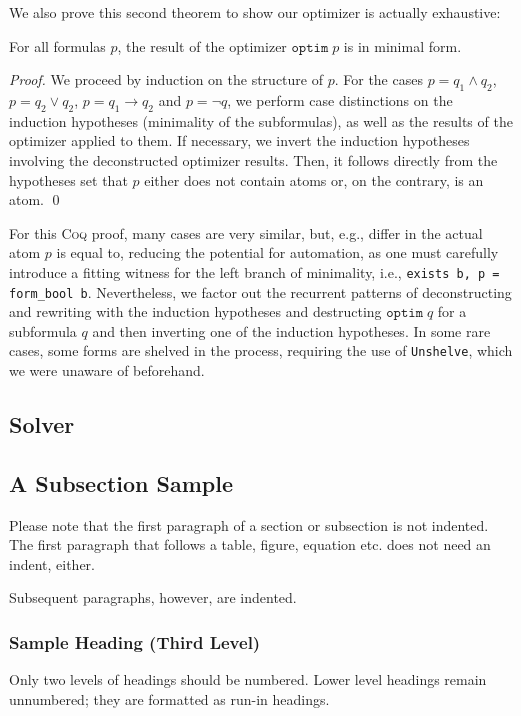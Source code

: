 We also prove this second theorem to show our optimizer is actually exhaustive:
\begin{theorem}
    For all formulas $p$, the result of the optimizer $\texttt{optim}\;p$ is in minimal form.
\end{theorem}
\begin{proof}
    We proceed by induction on the structure of $p$.
    For the cases $p = q_1 \land q_2$, $p = q_2 \lor q_2$, $p = q_1 \rightarrow q_2$ and $p = \neg q$, we perform case distinctions on the induction hypotheses (minimality of the subformulas), as well as the results of the optimizer applied to them.
    If necessary, we invert the induction hypotheses involving the deconstructed optimizer results.
    Then, it follows directly from the hypotheses set that $p$ either does not contain atoms or, on the contrary, is an atom. \qed
\end{proof}
For this \textsc{Coq} proof, many cases are very similar, but, e.g., differ in the actual atom $p$ is equal to, reducing the potential for automation, as one must carefully introduce a fitting witness for the left branch of minimality, i.e., \texttt{exists b, p = form\_bool b}.
Nevertheless, we factor out the recurrent patterns of deconstructing and rewriting with the induction hypotheses and destructing $\texttt{optim}\;q$ for a subformula $q$ and then inverting one of the induction hypotheses. In some rare cases, some forms are shelved in the process, requiring the use of \texttt{Unshelve}, which we were unaware of beforehand.

\subsection{Solver}


\subsection{A Subsection Sample}
Please note that the first paragraph of a section or subsection is
not indented. The first paragraph that follows a table, figure,
equation etc. does not need an indent, either.

Subsequent paragraphs, however, are indented.

\subsubsection{Sample Heading (Third Level)} Only two levels of
headings should be numbered. Lower level headings remain unnumbered;
they are formatted as run-in headings.


